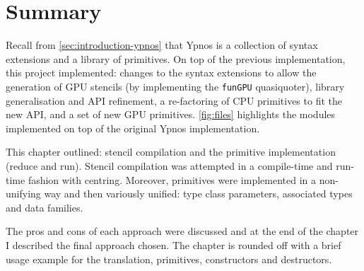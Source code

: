 \documentclass[
    12pt,
    a4paper,
    twoside,
    openright,
    BCOR=6mm,
    ]{scrbook}
\begin{document}
\section{Summary}

Recall from \autoref{sec:introduction-ypnos} that Ypnos is a collection of
syntax extensions and a library of primitives. On top of the previous
implementation, this project implemented: changes to the syntax extensions to
allow the generation of GPU stencils (by implementing the \texttt{funGPU}
quasiquoter), library generalisation and API refinement, a re-factoring of CPU
primitives to fit the new API, and a set of new GPU primitives.
\autoref{fig:files} highlights the modules implemented on top of the original
Ypnos implementation.

This chapter outlined: stencil compilation and the primitive implementation
(reduce and run). Stencil compilation was attempted in a compile-time and
run-time fashion with centring. Moreover, primitives were implemented in a
non-unifying way and then variously unified: type class parameters, associated
types and data families.

The pros and cons of each approach were discussed and at the end of the chapter
I described the final approach chosen. The chapter is rounded off with a brief
usage example for the translation, primitives, constructors and
destructors.
\end{document}
